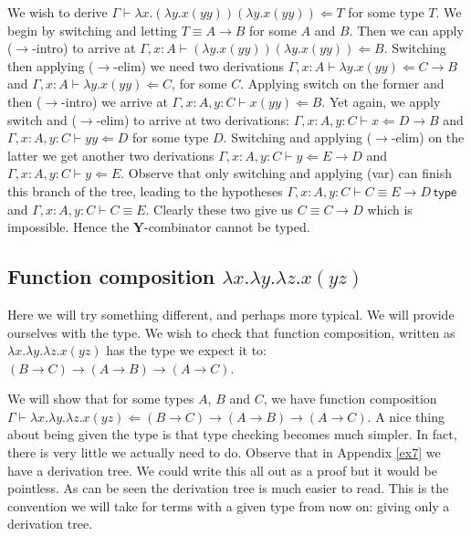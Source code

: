\begin{example}\label{y_comb}
    We wish to derive $\Gamma \vdash \lambda x . (\lambda y . x( y y)) (\lambda y . x (y y)) \Leftarrow T$ for some type $T$. We begin by switching and letting $T \equiv A \to B$ for some $A$ and $B$. Then we can apply ($\to$-intro) to arrive at $\Gamma , x : A \vdash (\lambda y . x (y y))(\lambda y . x (yy) ) \Leftarrow B$. Switching then applying ($\to$-elim) we need two derivations $\Gamma , x : A \vdash \lambda y . x (y y) \Leftarrow C \to B$ and $\Gamma , x : A \vdash \lambda y . x (y y) \Leftarrow C$, for some $C$. Applying switch on the former and then ($\to$-intro) we arrive at $\Gamma , x : A, y : C \vdash x ( y y) \Leftarrow B$. Yet again, we apply switch and ($\to$-elim) to arrive at two derivations: $\Gamma, x : A, y : C \vdash x \Leftarrow D \to B$ and $\Gamma , x : A, y : C \vdash y y \Leftarrow D$ for some type $D$. Switching and applying ($\to$-elim) on the latter we get another two derivations $\Gamma , x : A, y : C \vdash y \Leftarrow E \to D$ and $\Gamma , x : A, y : C \vdash y \Leftarrow E$. Observe that only switching and applying (var) can finish this branch of the tree, leading to the hypotheses $\Gamma , x : A, y : C \vdash C \equiv E \to D \ \mathsf{type}$ and $\Gamma , x : A, y : C \vdash C \equiv E$. Clearly these two give us $C \equiv C \to D$ which is impossible. Hence the $\mathbf{Y}$-combinator cannot be typed. 
\end{example}


\subsection{Function composition \texorpdfstring{$\lambda x . \lambda y . \lambda z . x ( y z)$}{}} %

Here we will try something different, and perhaps more typical. We will provide ourselves with the type. We wish to check that function composition, written as $\lambda x.\lambda y.\lambda z.x(yz)$ has the type we expect it to: $(B \to C) \to (A \to B) \to (A \to C)$.

\begin{example}\label{function_comp}
    We will show that for some types $A$, $B$ and $C$, we have function composition $\Gamma \vdash \lambda x.\lambda y.\lambda z.x(yz) \Leftarrow (B \to C) \to (A \to B) \to (A \to C)$.
    A nice thing about being given the type is that type checking becomes much simpler. In fact, there is very little we actually need to do. Observe that in Appendix \ref{ex7} we have a derivation tree. We could write this all out as a proof but it would be pointless. As can be seen the derivation tree is much easier to read.
    This is the convention we will take for terms with a given type from now on: giving only a derivation tree.
    
\end{example}



